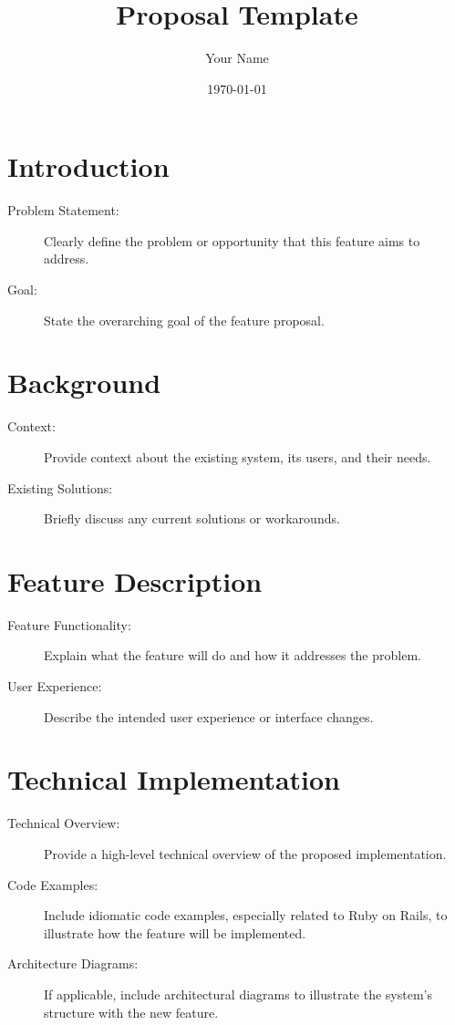 \documentclass{article}
\title{Proposal Template}
\author{Your Name}
\date{\today} %
\begin{document}
\maketitle

\section{Introduction}
\begin{description}
    \item[Problem Statement:] Clearly define the problem or opportunity that this feature aims to address.
    \item[Goal:] State the overarching goal of the feature proposal.
\end{description}

\section{Background}
\begin{description}
    \item[Context:] Provide context about the existing system, its users, and their needs.
    \item[Existing Solutions:] Briefly discuss any current solutions or workarounds.
\end{description}

\section{Feature Description}
\begin{description}
    \item[Feature Functionality:] Explain what the feature will do and how it addresses the problem.
    \item[User Experience:] Describe the intended user experience or interface changes.
\end{description}

\section{Technical Implementation}
\begin{description}
    \item[Technical Overview:] Provide a high-level technical overview of the proposed implementation.
    \item[Code Examples:] Include idiomatic code examples, especially related to Ruby on Rails, to illustrate how the feature will be implemented.
    \item[Architecture Diagrams:] If applicable, include architectural diagrams to illustrate the system's structure with the new feature.
\end{description}
\end{document}
